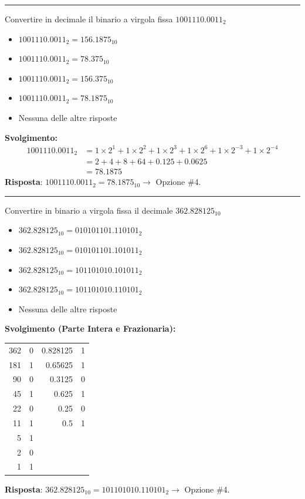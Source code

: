 \documentclass[12pt, a4paper]{article}
\begin{document}
\vspace{0.5cm}
\hrule
\vspace{0.5cm}

\newpage
Convertire in decimale il binario a virgola fissa $1001110.0011_2$
\begin{itemize}
    \item[$\square$] $1001110.0011_2 = 156.1875_{10}$
    \item[$\square$] $1001110.0011_2 = 78.375_{10}$
    \item[$\square$] $1001110.0011_2 = 156.375_{10}$
    \item[$\blacksquare$] $1001110.0011_2 = 78.1875_{10}$
    \item[$\square$] Nessuna delle altre risposte
\end{itemize}

\textbf{Svolgimento:}
\begin{align*}
1001110.0011_2 &= 1\times2^{1} + 1\times2^{2} + 1\times2^{3} + 1\times2^{6} + 1\times2^{-3} + 1\times2^{-4} \\
&= 2 + 4 + 8 + 64 + 0.125 + 0.0625 \\
&= 78.1875
\end{align*}
\textbf{Risposta}: $1001110.0011_2 = 78.1875_{10} \rightarrow$ Opzione \#4.

\vspace{0.5cm}
\hrule
\vspace{0.5cm}

Convertire in binario a virgola fissa il decimale $362.828125_{10}$
\begin{itemize}
    \item[$\square$] $362.828125_{10} = 010101101.110101_2$
    \item[$\square$] $362.828125_{10} = 010101101.101011_2$
    \item[$\square$] $362.828125_{10} = 101101010.101011_2$
    \item[$\blacksquare$] $362.828125_{10} = 101101010.110101_2$
    \item[$\square$] Nessuna delle altre risposte
\end{itemize}

\textbf{Svolgimento (Parte Intera e Frazionaria):}
\begin{center}
\begin{tabular}{r|c@{\hskip 1in}r|c}
362 & 0 & 0.828125 & 1 \\
181 & 1 & 0.65625  & 1 \\
 90 & 0 & 0.3125   & 0 \\
 45 & 1 & 0.625    & 1 \\
 22 & 0 & 0.25     & 0 \\
 11 & 1 & 0.5      & 1 \\
  5 & 1 &          &   \\
  2 & 0 &          &   \\
  1 & 1 &          &   
\end{tabular}
\end{center}
\textbf{Risposta}: $362.828125_{10} = 101101010.110101_2 \rightarrow$ Opzione \#4.
\end{document}

